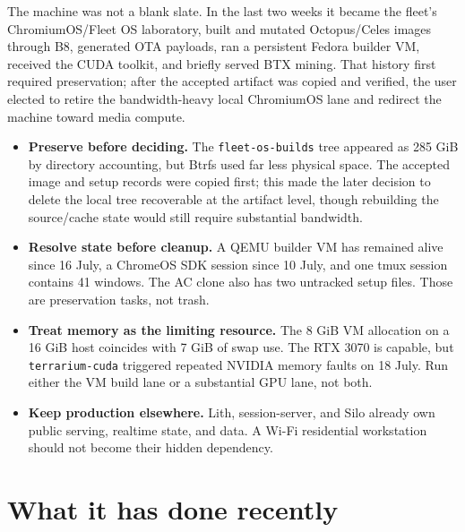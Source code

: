 \documentclass[11pt,letterpaper]{article}
\newcommand{\mono}[1]{\texttt{#1}}
\begin{document}
The machine was not a blank slate. In the last two weeks it became the fleet's ChromiumOS/Fleet OS laboratory, built and mutated Octopus/Celes images through B8, generated OTA payloads, ran a persistent Fedora builder VM, received the CUDA toolkit, and briefly served BTX mining. That history first required preservation; after the accepted artifact was copied and verified, the user elected to retire the bandwidth-heavy local ChromiumOS lane and redirect the machine toward media compute.

\begin{itemize}
  \item \textbf{Preserve before deciding.} The \mono{fleet-os-builds} tree appeared as 285 GiB by directory accounting, but Btrfs used far less physical space. The accepted image and setup records were copied first; this made the later decision to delete the local tree recoverable at the artifact level, though rebuilding the source/cache state would still require substantial bandwidth.
  \item \textbf{Resolve state before cleanup.} A QEMU builder VM has remained alive since 16 July, a ChromeOS SDK session since 10 July, and one tmux session contains 41 windows. The AC clone also has two untracked setup files. Those are preservation tasks, not trash.
  \item \textbf{Treat memory as the limiting resource.} The 8 GiB VM allocation on a 16 GiB host coincides with 7 GiB of swap use. The RTX 3070 is capable, but \mono{terrarium-cuda} triggered repeated NVIDIA memory faults on 18 July. Run either the VM build lane or a substantial GPU lane, not both.
  \item \textbf{Keep production elsewhere.} Lith, session-server, and Silo already own public serving, realtime state, and data. A Wi-Fi residential workstation should not become their hidden dependency.
\end{itemize}

\section{What it has done recently}
\end{document}
